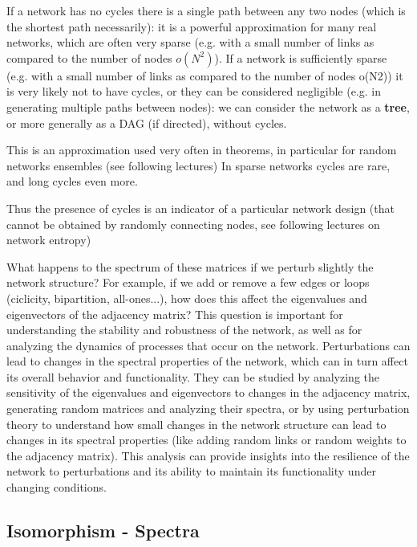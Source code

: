 If a network has no cycles there is a single path between any two nodes (which is the shortest path necessarily): it is a powerful approximation for many real networks, which are often very sparse (e.g. with a small number of links as compared to the number of nodes \(o(N^2)\)).
If a network is sufficiently sparse (e.g. with a small number of links as compared to the number of nodes o(N2)) it is very likely not to have cycles, or they can be considered negligible (e.g. in generating multiple paths between nodes): we can consider the network as a \textbf{tree}, or more generally as a DAG (if directed), without cycles.

This is an approximation used very often in theorems, in particular for random networks ensembles (see following lectures)
In sparse networks cycles are rare, and long cycles even more.

Thus the presence of cycles is an indicator of a particular network design (that cannot be obtained by randomly connecting nodes, see following lectures on network entropy)


What happens to the spectrum of these matrices if we perturb slightly the network structure? For example, if we add or remove a few edges or loops (ciclicity, bipartition, all-ones...), how does this affect the eigenvalues and eigenvectors of the adjacency matrix? This question is important for understanding the stability and robustness of the network, as well as for analyzing the dynamics of processes that occur on the network. Perturbations can lead to changes in the spectral properties of the network, which can in turn affect its overall behavior and functionality. They can be studied by analyzing the sensitivity of the eigenvalues and eigenvectors to changes in the adjacency matrix, generating random matrices and analyzing their spectra, or by using perturbation theory to understand how small changes in the network structure can lead to changes in its spectral properties (like adding random links or random weights to the adjacency matrix). This analysis can provide insights into the resilience of the network to perturbations and its ability to maintain its functionality under changing conditions.


\subsection{Isomorphism - Spectra}

